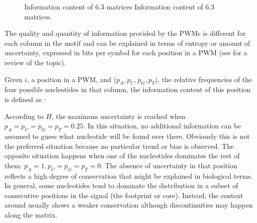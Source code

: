 \begin{figure}[t!]
\begin{center}
\setlength{\fboxsep}{0pt}
          {Information content of  6.3 matrices}%
          {Information content of  6.3 matrices.}%
          {}
\end{center}
\end{figure}


The quality and quantity of information provided by the PWMs is different 
for each column in the motif and can be explained in terms of entropy or
amount of uncertainty, expressed in bits per symbol for each position in a PWM (see
\citet{kim:2003a} for a review of the topic).

Given $i$, a position in a PWM, and ($p_A, p_C, p_G, p_T$), the relative frequencies
of the four possible nucleotides in that column, the information content of this position
is defined as \citep{schneider:1990a}: 

\begin{center}
\end{center}

According to $H$, the maximum uncertainty is reached when $p_A = p_C = p_G = p_T = 0.25$.
In this situation, no additional information can be assumed to guess what nucleotide will be 
found over there. Obviously this is not the preferred situation because no particular trend 
or bias is observed. The opposite situation happens when one of the nucleotides dominates the rest 
of them: $p_A = 1, p_C = p_G = p_T = 0$. The absence of uncertainty in that position reflects 
a high degree of conservation that might be explained in biological terms. In general, some
nucleotides tend to dominate the distribution in a subset of consecutive positions in
the signal (the footprint or core). Instead, the context around usually shows a weaker conservation
although discontinuities may happen along the matrix.

